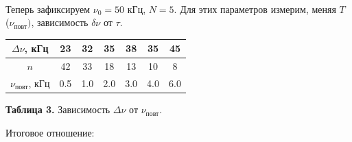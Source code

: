 \documentclass[a4paper, 12pt]{article}%
\begin{document}
\begin{figure}[h!]
    \\
\end{figure}
\newpage
Теперь зафиксируем $\nu_0 = 50$ кГц, $N = 5$. Для этих параметров измерим, меняя $T$ ($\nu_{\text{повт}})$, зависимость $\delta \nu$ от $\tau$. 
\begin{center}
\begin{tabular}{|c|c|c|c|c|c|c|}
\hline
$\Delta \nu$, кГц       & 23 & 32 & 35 & 38 & 35 & 45 \\ \hline
$n$                                                   & 42 & 33 & 18 & 13 & 10 &  8 \\ \hline
$\nu_{\text{повт}}$, кГц & 0.5 & 1.0  & 2.0  & 3.0  & 4.0 & 6.0  \\ \hline
\end{tabular}

\textbf{Таблица 3.} Зависимость $\Delta \nu$ от $\nu_{\text{повт}}$.
\end{center}
Итоговое отношение:
\end{document}
